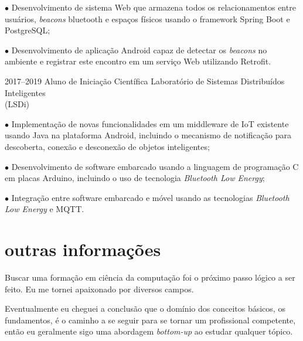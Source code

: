 \documentclass[]{../document-class/twentysecondcv}
\begin{document}
\begin{twenty}
{			$\bullet$ Desenvolvimento de sistema Web que armazena todos os relacionamentos entre usuários, \textit{beacons} bluetooth e espaços físicos usando o framework Spring Boot e PostgreSQL;\vskip 4pt
        
			$\bullet$ Desenvolvimento de aplicação Android capaz de detectar os \textit{beacons} no ambiente e registrar este encontro em um serviço Web utilizando Retrofit.}
			
	\twentyitem
		{2017--2019} %
		{Aluno de Iniciação Científica} %
		{Laboratório de Sistemas Distribuídos Inteligentes \\\hspace*{\fill}(LSDi)}
		{$\bullet$ Implementação de novas funcionalidades em um middleware de IoT existente usando Java na plataforma Android, incluindo o mecanismo de notificação para descoberta, conexão e desconexão de objetos inteligentes;\vskip 4pt 

			
		$\bullet$ Desenvolvimento de software embarcado usando a linguagem de programação C em placas Arduino, incluindo o uso de tecnologia \textit{Bluetooth Low Energy};\vskip 4pt 
		

		$\bullet$ Integração entre software embarcado e móvel usando as tecnologias \textit{Bluetooth Low Energy} e MQTT.}

		


\end{twenty}


\section{outras informações}

Buscar uma formação em ciência da computação foi o próximo passo lógico a ser feito. Eu me tornei apaixonado por diversos campos.

Eventualmente eu cheguei a conclusão que o domínio dos conceitos básicos, os fundamentos, é o caminho a se seguir para se tornar um profissional competente, então eu geralmente sigo uma abordagem \textit{bottom-up} ao estudar qualquer tópico.





\end{document}
